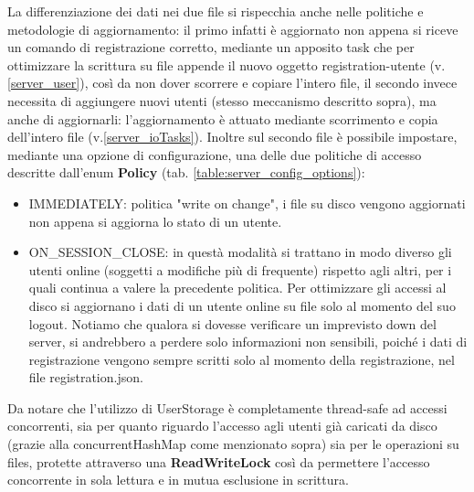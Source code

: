 \documentclass{article}
\begin{document}
    La differenziazione dei dati nei due file si rispecchia anche nelle politiche e metodologie di aggiornamento: il primo infatti è aggiornato non appena si riceve un comando di registrazione corretto, mediante un apposito task che per ottimizzare la scrittura su file appende il nuovo oggetto registration-utente (v.\ref{server_user}), così da non dover scorrere e copiare l'intero file, il secondo invece necessita di aggiungere nuovi utenti (stesso meccanismo descritto sopra), ma anche di aggiornarli: l'aggiornamento è attuato mediante scorrimento e copia dell'intero file (v.\ref{server_ioTasks}). Inoltre sul secondo file è possibile impostare, mediante una opzione di configurazione, una delle due politiche di accesso descritte dall'enum \textbf{Policy} (tab. \ref{table:server_config_options}):
    \begin{itemize}
        \item IMMEDIATELY: politica "write on change", i file su disco vengono aggiornati non appena si aggiorna lo stato di un utente.
        \item ON\_SESSION\_CLOSE: in questà modalità si trattano in modo diverso gli utenti online (soggetti a modifiche più di frequente) rispetto agli altri, per i quali continua a valere la precedente politica. Per ottimizzare gli accessi al disco si aggiornano i dati di un utente online su file solo al momento del suo logout. Notiamo che qualora si dovesse verificare un imprevisto down del server, si andrebbero a perdere solo informazioni non sensibili, poiché i dati di registrazione vengono sempre scritti solo al momento della registrazione, nel file registration.json.
    \end{itemize}

    Da notare che l'utilizzo di UserStorage è completamente thread-safe ad accessi concorrenti, sia per quanto riguardo l'accesso agli utenti già caricati da disco (grazie alla concurrentHashMap come menzionato sopra) sia per le operazioni su files, protette attraverso una \textbf{ReadWriteLock} così da permettere l'accesso concorrente in sola lettura e in mutua esclusione in scrittura.
\end{document}
